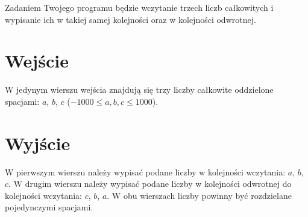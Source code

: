 \documentclass{spiral-kurs}
\begin{document}
\makeheader
%
  Zadaniem Twojego programu będzie wczytanie trzech liczb całkowitych
  i wypisanie ich w takiej samej kolejności oraz w kolejności odwrotnej.

  \section{Wejście}
  W jedynym wierszu wejścia znajdują się trzy liczby całkowite oddzielone spacjami:
  $a$, $b$, $c$ ($-1000 \le a,b,c \le 1000$).

  \section{Wyjście}
  W pierwszym wierszu należy wypisać podane liczby w kolejności wczytania: $a$, $b$, $c$.
  W drugim wierszu należy wypisać podane liczby w kolejności odwrotnej do
  kolejności wczytania: $c$, $b$, $a$.
  W obu wierszach liczby powinny być rozdzielane pojedynczymi spacjami.



  
\end{document}
